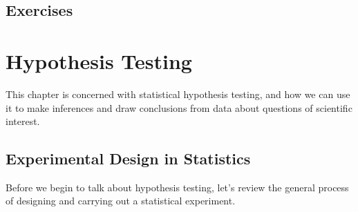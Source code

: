 \documentclass[twoside]{book}\usepackage[]{graphicx}\usepackage[]{xcolor}
\newif\ifsolutions
\newif\ifsolutionslocal
\begin{document}
\newpage
\section{Exercises}
\shipoutProblems


\ifsolutions
\ifsolutionslocal
\newpage
\section*{Solutions}
\shipoutSolutions
\fi
\fi




\chapter{Hypothesis Testing}

This chapter is concerned with statistical hypothesis testing, and how we can use it to make inferences and draw conclusions from data about questions of scientific interest.

\section{Experimental Design in Statistics}
Before we begin to talk about hypothesis testing, let's review the general process of designing and carrying out a statistical experiment.
\end{document}
